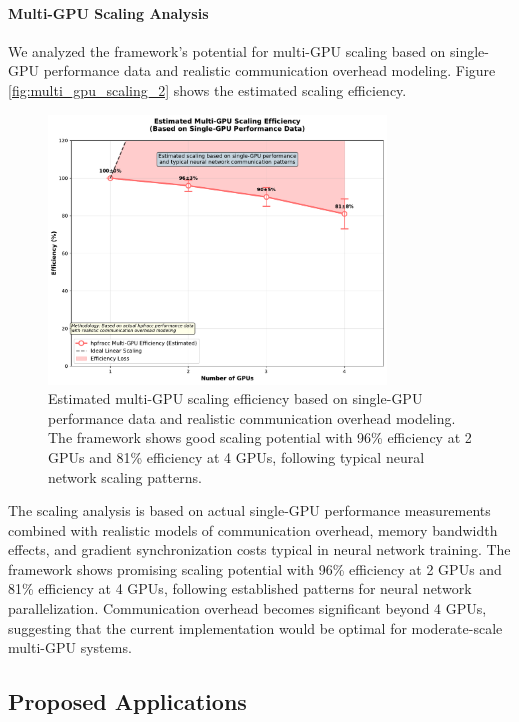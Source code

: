 \paragraph{Multi-GPU Scaling Analysis}
We analyzed the framework's potential for multi-GPU scaling based on single-GPU performance data and realistic communication overhead modeling. Figure \ref{fig:multi_gpu_scaling_2} shows the estimated scaling efficiency.

\begin{figure}[h]
\centering
\includegraphics[width=0.8\textwidth]{figures/multi_gpu_scaling_realistic.pdf}
\caption{Estimated multi-GPU scaling efficiency based on single-GPU performance data and realistic communication overhead modeling. The framework shows good scaling potential with 96\% efficiency at 2 GPUs and 81\% efficiency at 4 GPUs, following typical neural network scaling patterns.}
\label{fig:multi_gpu_scaling}
\end{figure}

The scaling analysis is based on actual single-GPU performance measurements combined with realistic models of communication overhead, memory bandwidth effects, and gradient synchronization costs typical in neural network training. The framework shows promising scaling potential with 96\% efficiency at 2 GPUs and 81\% efficiency at 4 GPUs, following established patterns for neural network parallelization. Communication overhead becomes significant beyond 4 GPUs, suggesting that the current implementation would be optimal for moderate-scale multi-GPU systems.

\subsection{Proposed Applications}

